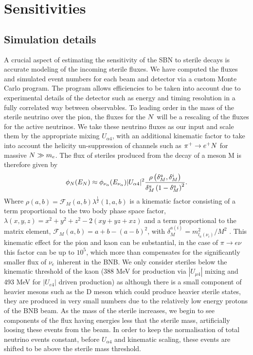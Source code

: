 \documentclass[11pt, a4paper]{article}
\def\ster{\ensuremath N}
\begin{document}
\section{Sensitivities}

\subsection{Simulation details}

A crucial aspect of estimating the sensitivity of the SBN to sterile decays is
accurate modeling of the incoming sterile fluxes. We have computed the fluxes
and simulated event numbers for each beam and detector via a custom Monte Carlo
program. The program allows efficiencies to be taken into account due to
experimental details of the detector such as energy and timing resolution in a
fully correlated way between observables. To leading order in the mass of the
sterile neutrino over the pion, the fluxes for the $\ster$ will be a rescaling
of the fluxes for the active neutrinos.  We take these neutrino fluxes as our
input and scale them by the appropriate mixing $U_{\alpha 4}$, with an
additional kinematic factor to take into account the helicity un-suppression of
channels such as $\pi^+ \rightarrow e^+\ster$ for massive $\ster \gg m_e$. The
flux of steriles produced from the decay of a meson M is therefore given by
%
\[
	\phi_{\ster}(E_{\ster}) \approx \phi_{\nu_\alpha} (E_{\nu_\alpha})\vert U_{\alpha 4}\vert^2 \frac{\rho\left( \delta_M^a , \delta_M^i \right)}{\delta_M^a \left(1- \delta_M^a\right)^2}.
\]
%
Where $\rho(a,b)=\mathcal{F}_M(a,b) \lambda^{\frac{1}{2}}(1,a,b)$ is a
kinematic factor consisting of a term proportional to the two body phase space
factor, $\lambda(x,y,z)=x^2+y^2+z^2-2(x y+yz+x z)$ and a term proportional to
the matrix element, $\mathcal{F}_M(a,b)= a+b -\left(a-b\right)^2$, with
$\delta_M^{a(i)}=m_{l_a(\nu_i)}^2/M^2$ \cite{PhysRevD.24.1232}. This kinematic
effect for the pion and kaon can be substantial, in the case of $\pi
\rightarrow e \nu$ this factor can be up to $10^5$, which more than compensates
for the significantly smaller flux of $\nu_e$  inherent in the BNB. We only
consider steriles below the kinematic threshold of the kaon (388 MeV for
production via $|U_{\mu4}|$ mixing and 493 MeV for $|U_{e4}|$ driven
production) as although there is a small component of heavier mesons such as
the D meson which could produce heavier sterile states, they are produced in
very small numbers due to the relatively low energy protons of the BNB beam. As
the mass of the sterile increases, we begin to see components of the flux
having energies less that the sterile mass, artificially loosing these events
from the beam. In order to keep the normalisation of total neutrino events
constant, before $U_{\alpha 4}$ and kinematic scaling, these events are shifted
to be above the sterile mass threshold. \\
\end{document}
